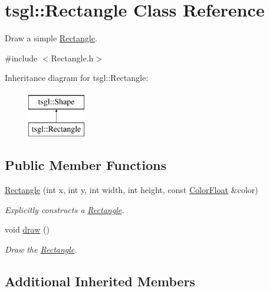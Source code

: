 \hypertarget{classtsgl_1_1_rectangle}{}\section{tsgl\+:\+:Rectangle Class Reference}
\label{classtsgl_1_1_rectangle}


Draw a simple \hyperlink{classtsgl_1_1_rectangle}{Rectangle}.  




{\ttfamily \#include $<$Rectangle.\+h$>$}

Inheritance diagram for tsgl\+:\+:Rectangle\+:\begin{figure}[H]
\begin{center}
\leavevmode
\includegraphics[height=2.000000cm]{classtsgl_1_1_rectangle}
\end{center}
\end{figure}
\subsection*{Public Member Functions}
\begin{DoxyCompactItemize}
\item 
\hyperlink{classtsgl_1_1_rectangle_a1fb2a492ffc57b2da380ea23d89e887b}{Rectangle} (int x, int y, int width, int height, const \hyperlink{structtsgl_1_1_color_float}{Color\+Float} \&color)
\begin{DoxyCompactList}\small\item\em Explicitly constructs a \hyperlink{classtsgl_1_1_rectangle}{Rectangle}. \end{DoxyCompactList}\item 
void \hyperlink{classtsgl_1_1_rectangle_addad1e65bc50d3669e6350aa32249c7f}{draw} ()
\begin{DoxyCompactList}\small\item\em Draw the \hyperlink{classtsgl_1_1_rectangle}{Rectangle}. \end{DoxyCompactList}\end{DoxyCompactItemize}
\subsection*{Additional Inherited Members}


